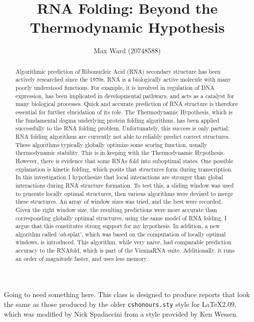 \documentclass{cshonours}
\title{RNA Folding: Beyond the Thermodynamic Hypothesis}
\author{Max Ward (20748588)}
\begin{document}
\maketitle

\begin{abstract}
Algorithmic prediction of Ribonucleic Acid (RNA) secondary structure has been actively researched since the 1970s. RNA is a biologically active molecule with many poorly understood functions. For example, it is involved in regulation of DNA expression, has been implicated in developmental pathways, and acts as a catalyst for many biological processes. Quick and accurate prediction of RNA structure is therefore essential for further elucidation of its role. The Thermodynamic Hypothesis, which is the fundamental dogma underlying protein folding algorithms, has been applied successfully to the RNA folding problem. Unfortunately, this success is only partial; RNA folding algorithms are currently not able to reliably predict correct structures. These algorithms typically globally optimize some scoring function, usually thermodynamic stability. This is in keeping with the Thermodynamic Hypothesis. However, there is evidence that some RNAs fold into suboptimal states. One possible explanation is kinetic folding, which posits that structures form during transcription. In this investigation I hypothesize that local interactions are stronger than global interactions during RNA structure formation. To test this, a sliding window was used to generate locally optimal structures, then various algorithms were devised to merge these structures. An array of window sizes was tried, and the best were recorded. Given the right window size, the resulting predictions were more accurate than corresponding globally optimal structures, using the same model of RNA folding. I argue that this constitutes strong support for my hypothesis. In addition, a new algorithm called `$ab$-splat', which was based on the computation of locally optimal windows, is introduced. This algorithm, while very naive, had comparable prediction accuracy to the RNAfold, which is part of the ViennaRNA suite. Additionally, it runs an order of magnitude faster, and uses less memory.
\end{abstract}

\begin{acknowledgements}
Going to need something here.
This class is designed to produce reports that look
the same as those produced by the older {\tt cshonours.sty} style for
\LaTeX 2.09, which was modified by Nick Spadaccini from a style
provided by Ken Wessen.
\end{acknowledgements}
\end{document}
